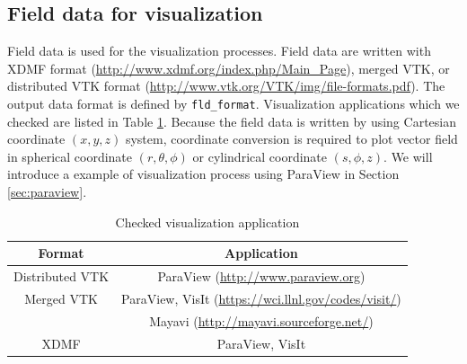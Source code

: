 \subsection{Field data for visualization}
\label{sec:VTK}
 Field data is used for the visualization processes.  Field data are written with XDMF format (\url{http://www.xdmf.org/index.php/Main_Page}), merged VTK, or distributed VTK format (\url{http://www.vtk.org/VTK/img/file-formats.pdf}). The output data format is defined by \verb|fld_format|. Visualization applications which we checked are listed in Table \ref{table:Viz_app}. Because the field data is written by using Cartesian coordinate $(x,y,z)$ system, coordinate conversion is required to plot vector field in spherical coordinate $(r, \theta, \phi)$ or cylindrical coordinate $(s,\phi, z)$. We will introduce a example of visualization process using ParaView in Section \ref{sec:paraview}.
%
%
\begin{table}[htdp]
\caption{Checked visualization application}
\label{table:Viz_app}
\begin{center} 
\begin{tabular}{|c|c|}
\hline
 Format & Application  \\ \hline \hline
Distributed VTK & ParaView (\url{http://www.paraview.org})  \\ \hline
Merged VTK & ParaView, VisIt (\url{https://wci.llnl.gov/codes/visit/}) \\
 & Mayavi (\url{http://mayavi.sourceforge.net/}) \\ \hline
XDMF   & ParaView, VisIt   \\ \hline
\end{tabular}
\end{center}
\end{table}
%

